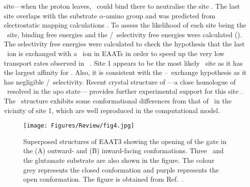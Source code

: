\begin{enumerate}[(i)]
    site---when the proton leaves, \K\ could bind there to neutralise the 
    site \cite{Kavanaugh1997}. The last site overlaps with the substrate 
    $\alpha$-amino group and was predicted from electrostatic mapping calculations 
    \cite{Holley2009}. To assess the likelihood of each site being the \K\ site, 
    binding free energies and the \K/\Na\ selectivity free energies were 
    calculated (). The selectivity free energies were 
    calculated to check the hypothesis that the last \Na\ ion is exchanged with 
    a \K\ ion in EAATs in order to speed up the very low transport rates observed 
    in \GltPh\ \cite{Heinzelmann2014b}. Site 1 appears to be the most likely \K\ 
    site as it has the largest affinity for \K. Also, it is consistent with the 
    \K--\Na\ exchange hypothesis as it has negligible \K/\Na\ selectivity. 
    Recent crystal structure of \GltTk---a close homologue of \GltPh\ resolved in 
    the apo state--- provides further experimental support for this site 
    \cite{Jensen2013}. The \GltTk\ structure exhibits some conformational 
    differences from that of \GltPh\ in the vicinity of site 1, 
    which are well reproduced in the computational model. 
\end{enumerate}

\begin{figure}[t!]
    \centering
    \texttt{[image: Figures/Review/fig4.jpg]}
    \caption{Superposed structures of EAAT3 showing the opening of the gate
    in the (A) outward- and (B) inward-facing conformations. Three \Na\ 
    and the glutamate substrate are also shown in the figure. The colour grey
    represents the closed conformation and purple represents the open 
    conformation. The figure is obtained from Ref.~\cite{Heinzelmann2014b}.}
    \label{review:fig4}
\end{figure}

